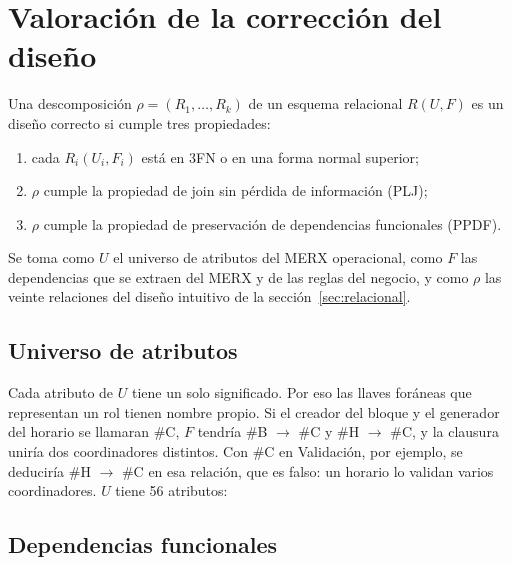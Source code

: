 \section{Valoración de la corrección del diseño}\label{sec:valoracion}

Una descomposición $\rho = (R_1, \dots, R_k)$ de un esquema relacional $R(U, F)$ es un diseño correcto si cumple tres propiedades:
\begin{enumerate}
  \item cada $R_i(U_i, F_i)$ está en 3FN o en una forma normal superior;
  \item $\rho$ cumple la propiedad de join sin pérdida de información (PLJ);
  \item $\rho$ cumple la propiedad de preservación de dependencias funcionales (PPDF).
\end{enumerate}
Se toma como $U$ el universo de atributos del MERX operacional, como $F$ las dependencias que se extraen del MERX y de las reglas del negocio, y como $\rho$ las veinte relaciones del diseño intuitivo de la sección~\ref{sec:relacional}.

\subsection{Universo de atributos}\label{sec:universo}

Cada atributo de $U$ tiene un solo significado. Por eso las llaves foráneas que representan un rol tienen nombre propio. Si el creador del bloque y el generador del horario se llamaran \#C, $F$ tendría \#B $\to$ \#C y \#H $\to$ \#C, y la clausura uniría dos coordinadores distintos. Con \#C en Validación, por ejemplo, se deduciría \#H $\to$ \#C en esa relación, que es falso: un horario lo validan varios coordinadores. $U$ tiene 56 atributos:



\subsection{Dependencias funcionales}

